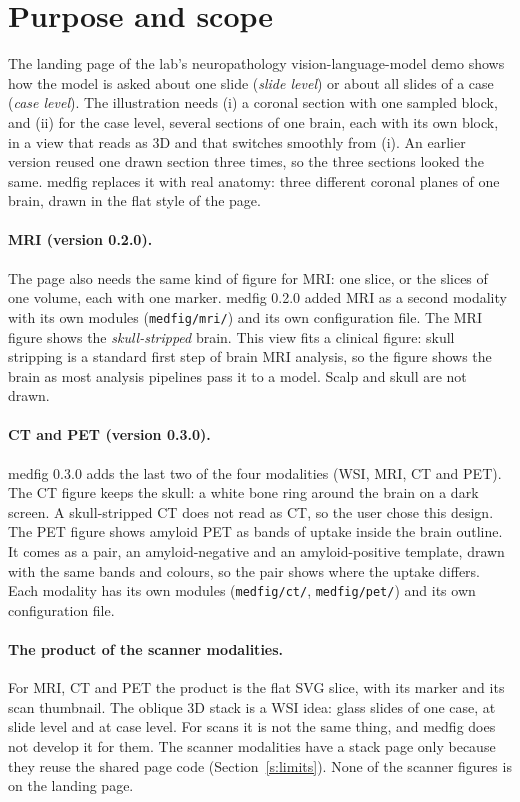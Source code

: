 \documentclass[10pt,a4paper]{article}
\newcommand{\code}[1]{\texttt{#1}}
\begin{document}
\section{Purpose and scope}\label{s:scope}
The landing page of the lab's neuropathology vision-language-model demo shows how the model is asked about one slide
(\emph{slide level}) or about all slides of a case (\emph{case level}). The illustration needs (i) a coronal section with one
sampled block, and (ii) for the case level, several sections of one brain, each with its own block, in a view that reads as 3D
and that switches smoothly from (i). An earlier version reused one drawn section three times, so the three sections looked the same.
medfig replaces it with real anatomy: three different coronal planes of one brain, drawn in the flat style of the page.

\paragraph{MRI (version 0.2.0).} The page also needs the same kind of figure for MRI: one slice, or the slices of one
volume, each with one marker. medfig 0.2.0 added MRI as a second modality with its own modules (\code{medfig/mri/}) and its
own configuration file. The MRI figure shows the \emph{skull-stripped} brain. This view fits a clinical figure: skull
stripping is a standard first step of brain MRI analysis, so the figure shows the brain as most analysis pipelines pass it to
a model. Scalp and skull are not drawn.

\paragraph{CT and PET (version 0.3.0).} medfig 0.3.0 adds the last two of the four modalities (WSI, MRI, CT and PET). The CT
figure keeps the skull: a white bone ring around the brain on a dark screen. A skull-stripped CT does not read as CT, so the
user chose this design. The PET figure shows amyloid PET as bands of uptake inside the brain outline. It comes as a pair, an
amyloid-negative and an amyloid-positive template, drawn with the same bands and colours, so the pair shows where the uptake
differs. Each modality has its own modules (\code{medfig/ct/}, \code{medfig/pet/}) and its own configuration file.

\paragraph{The product of the scanner modalities.} For MRI, CT and PET the product is the flat SVG slice, with its marker
and its scan thumbnail. The oblique 3D stack is a WSI idea: glass slides of one case, at slide level and at case level. For
scans it is not the same thing, and medfig does not develop it for them. The scanner modalities have a stack page only
because they reuse the shared page code (Section~\ref{s:limits}). None of the scanner figures is on the landing page.
\end{document}
